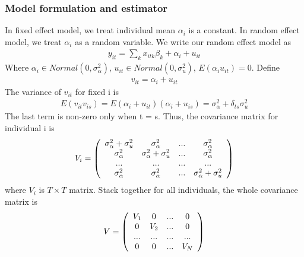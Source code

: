 \documentclass[a4paper]{article}
\begin{document}
\subsubsection{Model formulation and estimator}
In fixed effect model, we treat individual mean $\alpha_i$ is a constant. In random effect model, we treat $\alpha_i$ as a random variable. We write our random effect model as
\begin{align*}
y_{it} = \sum_k x_{itk}\beta_k + \alpha_i + u_{it}
\end{align*}
Where $\alpha_i \in Normal(0, \sigma_{\alpha}^2)$, $u_{it} \in Normal(0, \sigma^2_{u})$, $E(\alpha_i u_{it}) = 0$. 
Define
\begin{align*}
v_{it} = \alpha_i + u_{it}
\end{align*}
The variance of $v_{it}$ for fixed i is 
\begin{align*}
E(v_{it}v_{is}) = E(\alpha_i + u_{it})(\alpha_i + u_{is}) = \sigma^2_{\alpha} + \delta_{ts} \sigma^2_{u}
\end{align*}
The last term is non-zero only when t = s.
Thus, the covariance matrix for individual i is 
\begin{align*}
V_i = \left( \begin{array} {  c c c c } 
                   \sigma^2_{\alpha} + \sigma^2_{u} &  \sigma^2_{\alpha}  & ... &  \sigma^2_{\alpha}  \\
                   \sigma^2_{\alpha} & \sigma^2_{\alpha} + \sigma^2_{u} & ... & \sigma^2_{\alpha} \\
                  ... & ... & ...&...\\
                    \sigma^2_{\alpha} &  \sigma^2_{\alpha} & ... &\sigma^2_{\alpha} + \sigma^2_{u} \\
           \end{array} \right)
\end{align*}
where $V_i$ is  $T \times T$ matrix. Stack together for all individuals, the whole covariance matrix is
\begin{align*}
V =  \left( \begin{array} {  c c c c } 
                   V_1 &  0  & ... &  0  \\
                   0 & V_2& ... & 0 \\
                  ... & ... & ...&...\\
                  0 &  0 & ... & V_N\\
           \end{array} \right)
\end{align*}
\end{document}
